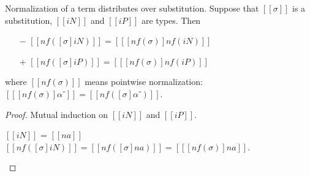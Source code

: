 \begin{lemma}
  \label{lemma:norm-subst-distr} Normalization of a term distributes over substitution.
  Suppose that $[[σ]]$ is a substitution, $[[iN]]$ and $[[iP]]$ are types. Then
    \begin{itemize}
      \item[$-$] $[[nf([σ]iN)]] = [[ [nf(σ)] nf(iN) ]]$
      \item[$+$] $[[nf([σ]iP)]] = [[ [nf(σ)] nf(iP) ]]$
  \end{itemize}
  where $[[nf(σ)]]$ means pointwise normalization: $[[ [nf(σ)] α⁻]] = [[nf([σ]α⁻)]]$.
\end{lemma}
\begin{proof}
  Mutual induction on $[[iN]]$ and $[[iP]]$.
  \begin{caseof}
    \item $[[iN]]$ = $[[na]]$ \\
      \label{case:norm-subst-distr-var}
      $[[nf([σ]iN)]] = [[ nf([σ]na) ]] = [[ [nf(σ)]na ]] $.


\end{caseof}
\end{proof}
